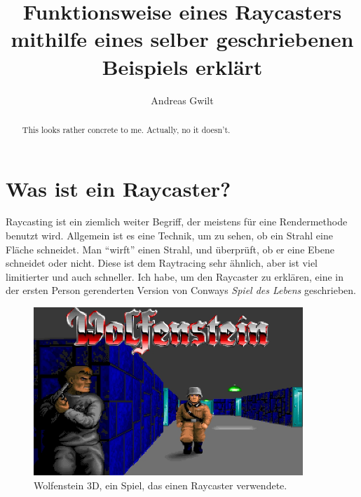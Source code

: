 \documentclass[a4paper,12pt]{report}
\title{Funktionsweise eines Raycasters mithilfe eines selber geschriebenen Beispiels erkl\"art}
\author{Andreas Gwilt}
\begin{document}
\maketitle
\tableofcontents

\begin{abstract}
This looks rather concrete to me. Actually, no it doesn't.
\end{abstract}

\section{Was ist ein Raycaster?}
Raycasting ist ein ziemlich weiter Begriff, der meistens für eine Rendermethode benutzt wird. Allgemein ist es eine Technik, um zu sehen, ob ein Strahl eine Fläche schneidet. Man ``wirft'' einen Strahl, und überprüft, ob er eine Ebene schneidet oder nicht. Diese ist dem Raytracing sehr ähnlich, aber ist viel limitierter und auch schneller.
Ich habe, um den Raycaster zu erklären, eine in der ersten Person gerenderten Version von Conways \textit{Spiel des Lebens} geschrieben. 

\begin{figure}[htbp] 
        \centering
        \includegraphics[width=4in]{wolfenstein-cover.jpg} 
        \caption{Wolfenstein 3D, ein Spiel, das einen Raycaster verwendete.}
\end{figure}
\end{document}
